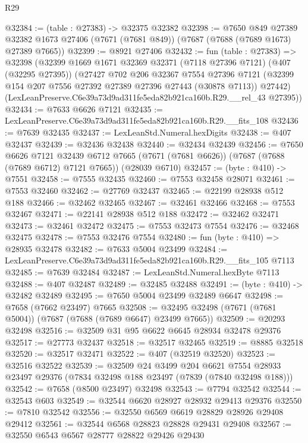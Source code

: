 \begin{lexlean}{R29}
\begin{coremodule}
@32384 := (table : @27383) -> @32375 @32382
@32398 := @7650
    @849
    @27389
    @32382
    @1673
    @27406
    (@7671 (@7681 @849))
    (@7687 (@7688 (@7689 @1673) @27389 @7665))
@32399 := @8921 @27406
@32432 := fun (table : @27383) =>
  @32398
    (@32399
      @1669
      @1671
      @32369
      @32371
      (@7118 @27396 @7121)
      (@407 (@32295 @27395))
      (@27427
        @702
        @206
        @32367
        @7554
        @27396
        @7121
        (@32399 @154 @207 @7556 @27392 @27389 @27396 @27443 (@30878 @7113))
        @27442)
      (LexLeanPreserve.C6e39a73d9ad311fe5eda82b921ca160b.R29.__rel_43 @27395))
@32434 := @7633 @6626 @7121
@32435 := LexLeanPreserve.C6e39a73d9ad311fe5eda82b921ca160b.R29.__fits_108
@32436 := @7639 @32435
@32437 := LexLeanStd.Numeral.hexDigits
@32438 := @407 @32437
@32439 := @32436 @32438
@32440 := @32434 @32439
@32456 := @7650
    @6626
    @7121
    @32439
    @6712
    @7665
    (@7671 (@7681 @6626))
    (@7687 (@7688 (@7689 @6712) @7121 @7665))
    (@28039 @6710)
@32457 := (byte : @410) -> @7551
@32458 := @7555 @32435
@32460 := @7553 @32458 @28071
@32461 := @7553 @32460
@32462 := @27769 @32437
@32465 := @22199 @28938 @512 @188
@32466 := @32462 @32465
@32467 := @32461 @32466
@32468 := @7553 @32467
@32471 := @22141 @28938 @512 @188
@32472 := @32462 @32471
@32473 := @32461 @32472
@32475 := @7553 @32473 @7554
@32476 := @32468 @32475
@32478 := @7553 @32476 @7554
@32480 := fun (byte : @410) => @28935 @32478
@32482 := @7633 @5004 @23499
@32484 := LexLeanPreserve.C6e39a73d9ad311fe5eda82b921ca160b.R29.__fits_105 @7113
@32485 := @7639 @32484
@32487 := LexLeanStd.Numeral.hexByte @7113
@32488 := @407 @32487
@32489 := @32485 @32488
@32491 := (byte : @410) -> @32482 @32489
@32495 := @7650 @5004 @23499 @32489 @6647
@32498 := @7658 (@7662 @23497) @7665
@32508 := @32495 @32498 (@7671 (@7681 @5004)) (@7687 (@7688 (@7689 @6647) @23499 @7665))
@32509 := @20293 @32498
@32516 := @32509 @31 @95 @6622 @6645 @28934 @32478 @29376
@32517 := @27773 @32437
@32518 := @32517 @32465
@32519 := @8885 @32518
@32520 := @32517 @32471
@32522 := @407 (@32519 @32520)
@32523 := @32516 @32522
@32539 := @32509
    @24
    @3499
    @204
    @6621
    @7554
    @28933
    @23497
    @29376
    (@7834 @32498 @188 @23497 (@7839 (@7840 @32498 @188)))
@32542 := @7658 (@8500 @23497) @32498
@32543 := @7794 @32542
@32544 := @32543 @603
@32549 := @32544 @6620 @28927 @28932 @29413 @29376
@32550 := @7810 @32542
@32556 := @32550 @6569 @6619 @28829 @28926 @29408 @29412
@32561 := @32544 @6568 @28823 @28828 @29431 @29408
@32567 := @32550 @6543 @6567 @28777 @28822 @29426 @29430

\end{coremodule}
\end{lexlean}
